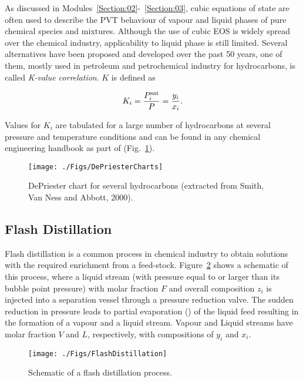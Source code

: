 As discussed in Modules~\ref{Section:02}-~\ref{Section:03}, cubic equations of state are often used to describe the PVT behaviour of vapour and liquid phases of pure chemical species and mixtures. Although the use of cubic EOS is widely spread over the chemical industry, applicability to liquid phase is still limited. Several alternatives have been proposed and developed over the past 50 years, one of them, mostly used in petroleum and petrochemical industry for hydrocarbons, is called {\it K-value correlation}. $K$ is defined as
\begin{shaded}
   \begin{equation}
      K_{i} = \displaystyle\frac{P_{i}^{\text{sat}}}{P} = \displaystyle\frac{y_{i}}{x_{i}}.\label{Chapter:VLE:PartialMolarProperties:KValue}
   \end{equation}
\end{shaded}
Values for $K_{i}$ are tabulated for a large number of hydrocarbons at several pressure and temperature conditions and can be found in any chemical engineering handbook as part of  (Fig.~\ref{Mod04Fig05}).
  \begin{figure}[h]
     \begin{center}
         \texttt{[image: ./Figs/DePriesterCharts]}
     \end{center}
     \caption{DePriester chart for several hydrocarbons (extracted from Smith, Van Ness and Abbott, 2000).}\label{Mod04Fig05}
  \end{figure}


\subsection{Flash Distillation}\label{Chapter:VLE:FlashDistillation}

Flash distillation is a common process in chemical industry to obtain solutions with the required enrichment from a feed-stock. Figure~\ref{Mod04Fig06} shows a schematic of this process, where a liquid stream (\ie with pressure equal to or larger than its bubble point pressure) with molar fraction $F$ and overall composition $z_{i}$ is injected into a separation vessel through a pressure reduction valve. The sudden reduction in pressure leads to partial evaporation () of the liquid feed resulting in the formation of a vapour and a liquid stream. Vapour and Liquid streams have molar fraction $V$ and $L$, respectively, with compositions of $y_{i}$ and $x_{i}$. 
  \begin{figure}[h]
     \begin{center}
         \texttt{[image: ./Figs/FlashDistillation]}
     \end{center}
     \caption{Schematic of a flash distillation process.}\label{Mod04Fig06}
  \end{figure}
        
